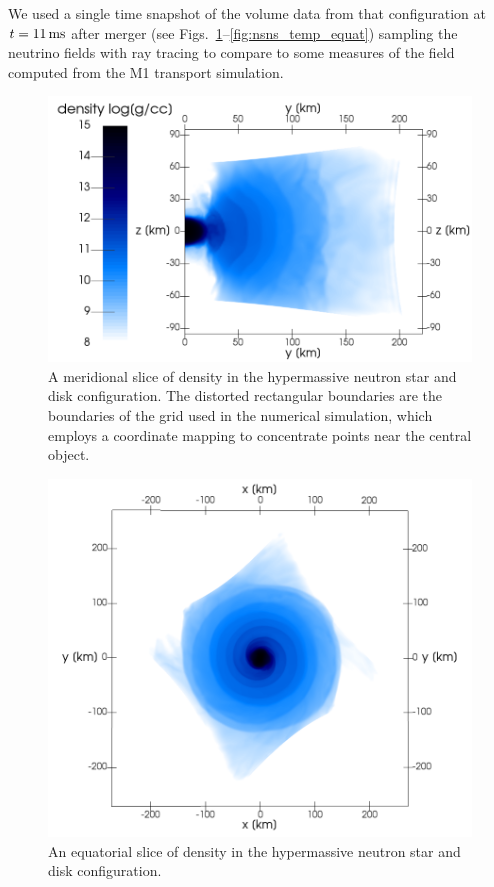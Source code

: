 \documentclass[aps,floatfix,prd,superscriptaddress,twocolumn]{revtex4-1}
\begin{document}
We used a single time snapshot of the volume data from that configuration
at $t=11\,{\rm ms}$ after merger (see
Figs.~\ref{fig:nsns_rho_merid}--\ref{fig:nsns_temp_equat})
sampling the neutrino fields with ray tracing to compare to some
measures of the field computed from the M1 transport simulation.

\begin{figure}
  \includegraphics[width=\columnwidth]{production-colormap-merid-rho}
  \caption{A meridional slice of density in the hypermassive neutron
    star and disk configuration.
    The distorted rectangular boundaries are the boundaries of the grid
    used in the numerical simulation, which employs a coordinate mapping to
    concentrate points near the central object.}
  \label{fig:nsns_rho_merid}
\end{figure}

\begin{figure}
  \includegraphics[width=\columnwidth]{production-colormap-equat-rho}
  \caption{An equatorial slice of density in the hypermassive neutron
    star and disk configuration.}
  \label{fig:nsns_rho_equat}
\end{figure}
\end{document}
